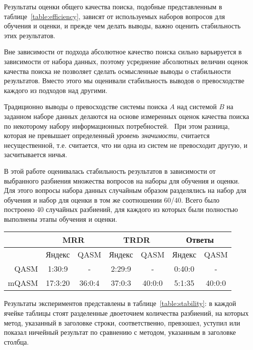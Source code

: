 \documentclass{article}
\begin{document}
Результаты оценки общего качества поиска, подобные представленным в
таблице~\ref{table:efficiency}, зависят от используемых наборов вопросов для
обучения и оценки, и прежде чем делать выводы,
важно оценить стабильность этих результатов.

Вне зависимости от подхода абсолютное качество поиска сильно варьируется в
зависимости от набора данных, поэтому усреднение абсолютных величин оценок
качества поиска не позволяет сделать осмысленные выводы о стабильности
результатов. Вместо этого мы оценивали стабильность выводов о
превосходстве каждого из подходов над другими.

Традиционно выводы о превосходстве системы поиска $A$ над системой $B$ на
заданном наборе данных делаются на основе измеренных оценок качества поиска
по некоторому набору информационных потребностей.~\cite{irg:eval}
При этом разница, которая не превышает определенный {\em уровень значимости},
считается несущественной, т.е. считается, что ни одна из систем не превосходит другую,
и засчитывается ничья.

В этой работе оценивалась стабильность результатов
в зависимости от выбранного разбиения множества вопросов
на наборы для обучения и оценки.
Для этого вопросы набора данных случайным образом разделялись на набор для обучения
и набор для оценки в том же соотношении 60/40.
Всего было построено 40 случайных разбиений,
для каждого из которых были полностью выполнены этапы обучения и оценки.

\begin{table*}
\begin{center}
\begin{tabular}{|r|cc|cc|cc|}
\hline
    &  \multicolumn{2}{c|}{MRR} &  \multicolumn{2}{c|}{TRDR} &  \multicolumn{2}{c|}{Ответы} \\
\hline
    & Яндекс & QASM & Яндекс & QASM & Яндекс & QASM  \\
\hline
QASM         &  1:30:9   &   -           &   2:29:9  &  -              &  0:40:0   &  -  \\
mQASM  &  17:3:20  & 36:0:4   &    37:0:3   & 40:0:0   &  5:1:35  & 40:0:0  \\
\hline
\end{tabular}
\caption{Стабильность выводов о превосходстве (уровень значимости 5\%)}
\label{table:stability}
\end{center}
\end{table*}

Результаты экспериментов представлены в таблице~\ref{table:stability}:
в каждой ячейке таблицы стоят разделенные двоеточием количества разбиений,
на которых метод, указанный в заголовке строки,
соответственно, превзошел, уступил или показал ничейный результат
по сравнению с методом, указанным в заголовке столбца.
\end{document}
